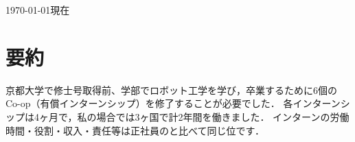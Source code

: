 \documentclass[10pt, a4paper]{article}
\begin{document}
\thispagestyle{plain}

\hfill{\footnotesize{\today 現在}}

\section{要約}
京都大学で修士号取得前、学部でロボット工学を学び，卒業するために6個のCo-op（有償インターンシップ）を修了することが必要でした．
各インターンシップは4ヶ月で，私の場合では3ヶ国で計2年間を働きました．
インターンの労働時間・役割・収入・責任等は正社員のと比べて同じ位です．
\end{document}
